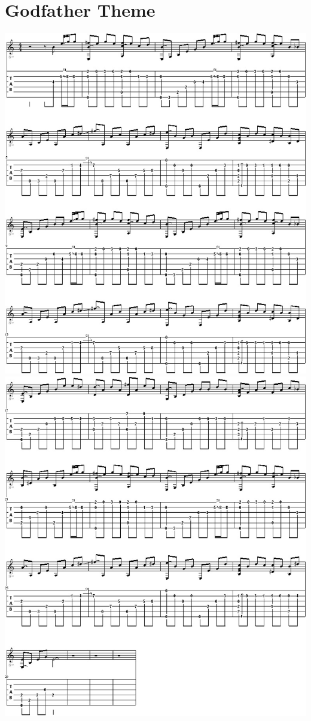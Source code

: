 \documentclass[]{book}
\let\stdsection\section
\renewcommand\section{\clearpage\stdsection}
\begin{document}
\hypertarget{godfather-theme}{%
\section{Godfather Theme}\label{godfather-theme}}

\includegraphics{notes_and_tabs/godfather_theme_S1.png}
\includegraphics{notes_and_tabs/godfather_theme_S2.png}
\end{document}
